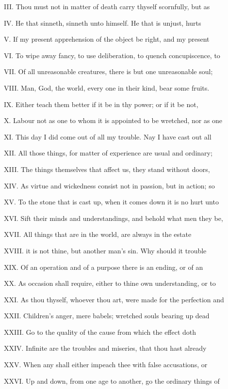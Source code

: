 III. Thou must not in matter of death carry
thyself scornfully, but as

IV. He that sinneth, sinneth unto himself. He
that is unjust, hurts

V. If my present apprehension of the object be
right, and my present

VI. To wipe away fancy, to use deliberation,
to quench concupiscence, to

VII. Of all unreasonable creatures, there is
but one unreasonable soul;

VIII. Man, God, the world, every one in their
kind, bear some fruits.

IX. Either teach them better if it be in thy
power; or if it be not,

X. Labour not as one to whom it is appointed
to be wretched, nor as one

XI. This day I did come out of all my trouble.
Nay I have cast out all

XII. All those things, for matter of
experience are usual and ordinary;

XIII. The things themselves that affect us,
they stand without doors,

XIV. As virtue and wickedness consist not in
passion, but in action; so

XV. To the stone that is cast up, when it
comes down it is no hurt unto

XVI. Sift their minds and understandings, and
behold what men they be,

XVII. All things that are in the world, are
always in the estate

XVIII. it is not thine, but another man's sin.
Why should it trouble

XIX. Of an operation and of a purpose there is
an ending, or of an

XX. As occasion shall require, either to thine
own understanding, or to

XXI. As thou thyself, whoever thou art, were
made for the perfection and

XXII. Children's anger, mere babels; wretched
souls bearing up dead

XXIII. Go to the quality of the cause from
which the effect doth

XXIV. Infinite are the troubles and miseries,
that thou hast already

XXV. When any shall either impeach thee with
false accusations, or

XXVI. Up and down, from one age to another, go
the ordinary things of


